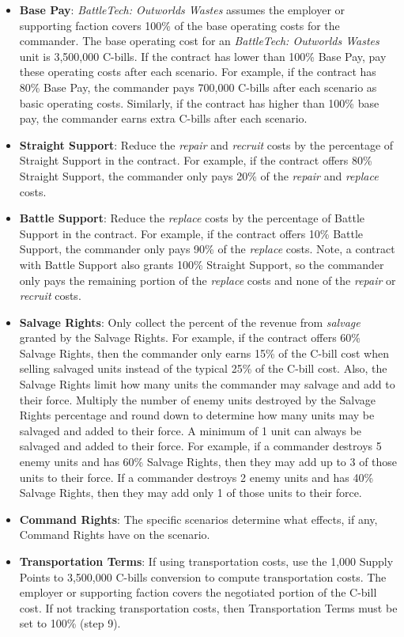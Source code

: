\begin{itemize}

\item {\bfseries Base Pay}: \emph{BattleTech: Outworlds Wastes} assumes the employer or supporting faction covers 100\% of the base operating costs for the commander.
The base operating cost for an \emph{BattleTech: Outworlds Wastes} unit is 3,500,000 C-bills.
If the contract has lower than 100\% Base Pay, pay these operating costs after each scenario.
For example, if the contract has 80\% Base Pay, the commander pays 700,000 C-bills after each scenario as basic operating costs.
Similarly, if the contract has higher than 100\% base pay, the commander earns extra C-bills after each scenario.

\item {\bfseries Straight Support}: Reduce the \emph{repair} and \emph{recruit} costs by the percentage of Straight Support in the contract.
For example, if the contract offers 80\% Straight Support, the commander only pays 20\% of the \emph{repair} and \emph{replace} costs.

\item {\bfseries Battle Support}: Reduce the \emph{replace} costs by the percentage of Battle Support in the contract.
For example, if the contract offers 10\% Battle Support, the commander only pays 90\% of the \emph{replace} costs.
Note, a contract with Battle Support also grants 100\% Straight Support, so the commander only pays the remaining portion of the \emph{replace} costs and none of the \emph{repair} or \emph{recruit} costs.

\item {\bfseries Salvage Rights}: Only collect the percent of the revenue from \emph{salvage} granted by the Salvage Rights.
For example, if the contract offers 60\% Salvage Rights, then the commander only earns 15\% of the C-bill cost when selling salvaged units instead of the typical 25\% of the C-bill cost.
Also, the Salvage Rights limit how many units the commander may salvage and add to their force.
Multiply the number of enemy units destroyed by the Salvage Rights percentage and round down to determine how many units may be salvaged and added to their force.
A minimum of 1 unit can always be salvaged and added to their force.
For example, if a commander destroys 5 enemy units and has 60\% Salvage Rights, then they may add up to 3 of those units to their force.
If a commander destroys 2 enemy units and has 40\% Salvage Rights, then they may add only 1 of those units to their force.

\item {\bfseries Command Rights}: The specific scenarios determine what effects, if any, Command Rights have on the scenario.

\item {\bfseries Transportation Terms}: If using transportation costs, use the 1,000 Supply Points to 3,500,000 C-bills conversion to compute transportation costs.
The employer or supporting faction covers the negotiated portion of the C-bill cost.
If not tracking transportation costs, then Transportation Terms must be set to 100\% (step 9).

\end{itemize}

